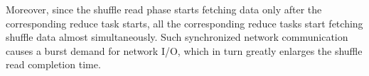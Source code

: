 Moreover, since the shuffle read phase starts fetching data only after the corresponding reduce task starts, all the corresponding reduce tasks start fetching shuffle data almost simultaneously.
Such synchronized network communication causes a burst demand for network I/O, which in turn greatly enlarges the shuffle read completion time. 
{\color{black}
}


